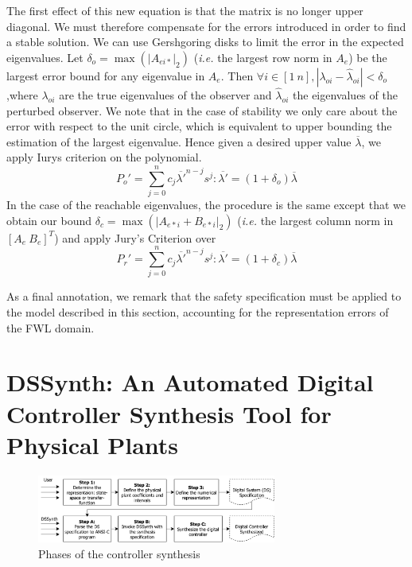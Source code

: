 \documentclass[twocolumn]{autart}    %
\newcommand{\mat}[1]{{#1}}
\begin{document}
{The first effect of this new equation is that the matrix is no longer upper
diagonal.  We must therefore compensate for the errors introduced in order
to find a stable solution.  We can use Gershgoring disks to limit the error
in the expected eigenvalues.  Let $\delta_o=\max(|\mat{A}_{ei*}|_2)$
(\emph{i.e.} the largest row norm in $\mat{A}_e$) be the largest error bound
for any eigenvalue in $\mat{A}_e$.  Then $\forall i \in [1\ n],
|\lambda_{oi}-\hat{\lambda}_{oi}|<\delta_o$,where $\lambda_{oi}$ are the
true eigenvalues of the observer and $\hat{\lambda}_{oi}$ the eigenvalues of
the perturbed observer.  We note that in the case of stability we only care
about the error with respect to the unit circle, which is equivalent to
upper bounding the estimation of the largest eigenvalue.  Hence given a
desired upper value $\overline{\lambda}$, we apply Iurys criterion on the
polynomial.
%
\begin{equation}
P_o'=\sum_{j=0}^n c_j\overline{\lambda'}^{n-j}s^j : \overline{\lambda'}=(1+\delta_o)\overline{\lambda}
\end{equation}
%
In the case of the reachable eigenvalues, the procedure is the same except
that we obtain our bound $\delta_c=\max(|\mat{A}_{e*i}+\mat{B}_{e*i}|_2)$
(\emph{i.e.} the largest column norm in $[\mat{A}_e\ \mat{B}_e]^T$) and
apply Jury's Criterion over
%
\begin{equation}
P_r'=\sum_{j=0}^n c_j\overline{\lambda'}^{n-j}s^j : \overline{\lambda'}=(1+\delta_c)\overline{\lambda}
\end{equation}

As a final annotation, we remark that the safety specification must be
applied to the model described in this section, accounting for the
representation errors of the FWL domain.
}


\section{DSSynth: An Automated Digital Controller Synthesis Tool for Physical Plants}
\label{sec:dssynthtool}

\begin{figure}[t]
\centering
\includegraphics[width=0.7\textwidth]{figures/synthesis-flow.pdf}
\caption{Phases of the controller synthesis}
\label{fig:synthesis-flow}
\end{figure}
\end{document}
